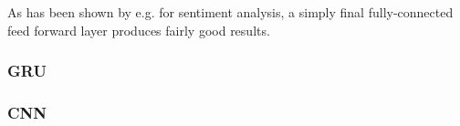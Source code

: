 As has been shown by e.g. \cite{myagmar2019transferable} for sentiment analysis, a simply final fully-connected feed forward layer produces fairly good results.

\subsubsection{GRU}

\subsubsection{CNN}


% 
% 
% 
% 
% 
% 
% 
% 
